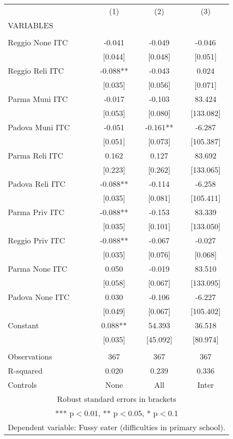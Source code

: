 \begin{tabular}{lccc} \hline
 & (1) & (2) & (3) \\
VARIABLES &  &  &  \\ \hline
 &  &  &  \\
Reggio None ITC & -0.041 & -0.049 & -0.046 \\
 & [0.044] & [0.048] & [0.051] \\
Reggio Reli ITC & -0.088** & -0.043 & 0.024 \\
 & [0.035] & [0.056] & [0.071] \\
Parma Muni ITC & -0.017 & -0.103 & 83.424 \\
 & [0.053] & [0.080] & [133.082] \\
Padova Muni ITC & -0.051 & -0.161** & -6.287 \\
 & [0.051] & [0.073] & [105.387] \\
Parma Reli ITC & 0.162 & 0.127 & 83.692 \\
 & [0.223] & [0.262] & [133.065] \\
Padova Reli ITC & -0.088** & -0.114 & -6.258 \\
 & [0.035] & [0.081] & [105.411] \\
Parma Priv ITC & -0.088** & -0.153 & 83.339 \\
 & [0.035] & [0.101] & [133.050] \\
Reggio Priv ITC & -0.088** & -0.067 & -0.027 \\
 & [0.035] & [0.076] & [0.068] \\
Parma None ITC & 0.050 & -0.019 & 83.510 \\
 & [0.058] & [0.067] & [133.095] \\
Padova None ITC & 0.030 & -0.106 & -6.227 \\
 & [0.049] & [0.067] & [105.402] \\
Constant & 0.088** & 54.393 & 36.518 \\
 & [0.035] & [45.092] & [80.974] \\
 &  &  &  \\
Observations & 367 & 367 & 367 \\
R-squared & 0.020 & 0.239 & 0.336 \\
 Controls & None & All & Inter \\ \hline
\multicolumn{4}{c}{ Robust standard errors in brackets} \\
\multicolumn{4}{c}{ *** p$<$0.01, ** p$<$0.05, * p$<$0.1} \\
\multicolumn{4}{c}{ Dependent variable: Fussy eater (difficulties in primary school).} \\
\end{tabular}
